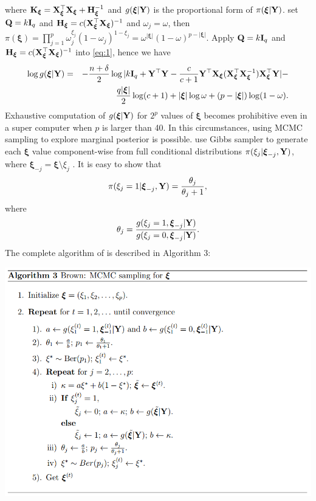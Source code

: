 \documentclass[]{book}
\begin{document}
where \({\bf K}_{{\boldsymbol \xi}} = {\bf X}_{{\boldsymbol \xi}}^{{\top}}{\bf X}_{{\boldsymbol \xi}}+{\bf H}_{{\boldsymbol \xi}}^{-1}\) and \(g({\boldsymbol \xi}|{\bf Y})\) is the proportional form of \(\pi({\boldsymbol \xi}|{\bf Y})\). \citep{Brown} set \({\bf Q}= k{\bf I}_q\) and \({\bf H}_{{\boldsymbol \xi}} = c({\bf X}_{{\boldsymbol \xi}}^{{\top}}{\bf X}_{{\boldsymbol \xi}})^{-1}\) and \(\omega_j = \omega\), then \(\pi({\boldsymbol \xi}) = \prod_{j=1}^{p}\omega_j^{\xi_j}(1-\omega_j)^{1-\xi_j} = \omega^{|{\boldsymbol \xi}|}(1-\omega)^{p-|{\boldsymbol \xi}|}\). Apply \({\bf Q}= k{\bf I}_q\) and \({\bf H}_{{\boldsymbol \xi}} = c({\bf X}_{{\boldsymbol \xi}}^{{\top}}{\bf X}_{{\boldsymbol \xi}})^{-1}\) into \eqref{eq:1}, hence we have
\begin{eqnarray*}
\log g({\boldsymbol \xi}|{\bf Y}) &=& -\frac{n+\delta}{2}\log|k{\bf I}_{q} + {\bf Y}^{{\top}}{\bf Y}- \frac{c}{c+1}{\bf Y}^{{\top}}{\bf X}_{{\boldsymbol \xi}}({\bf X}_{{\boldsymbol \xi}}^{{\top}}{\bf X}_{{\boldsymbol \xi}}^{-1}){\bf X}_{{\boldsymbol \xi}}^{{\top}}{\bf Y}|-\\
&&\frac{q|{\boldsymbol \xi}|}{2}\log(c+1)+ |{\boldsymbol \xi}|\log\omega+(p-|{\boldsymbol \xi}|)\log(1-\omega).
\end{eqnarray*}
Exhaustive computation of \(g({\boldsymbol \xi}|{\bf Y})\) for \(2^p\) values of \({\boldsymbol \xi}\) becomes prohibitive even in a super computer when \(p\) is larger than 40. In this circumstances, using MCMC sampling to explore marginal posterior is possible. \citep{Brown} use Gibbs sampler to generate each \({\boldsymbol \xi}\) value component-wise from full conditional distributions \(\pi(\xi_j|{\boldsymbol \xi}_{-j},{\bf Y})\), where \({\boldsymbol \xi}_{-j} = {\boldsymbol \xi}\setminus {\xi_j}\) . It is easy to show that
\begin{eqnarray*}
\pi(\xi_j = 1|{\boldsymbol \xi}_{-j},{\bf Y}) = \frac{\theta_j}{\theta_j+1},
\end{eqnarray*}
where
\begin{eqnarray*}
\theta_j = \frac{g(\xi_j = 1, {\boldsymbol \xi}_{-j}|{\bf Y})}{g(\xi_j = 0, {\boldsymbol \xi}_{-j}|{\bf Y})}.
\end{eqnarray*}
The complete algorithm of \citep{Brown} is described in Algorithm 3:

\includegraphics{alg-brown.png}
\end{document}
